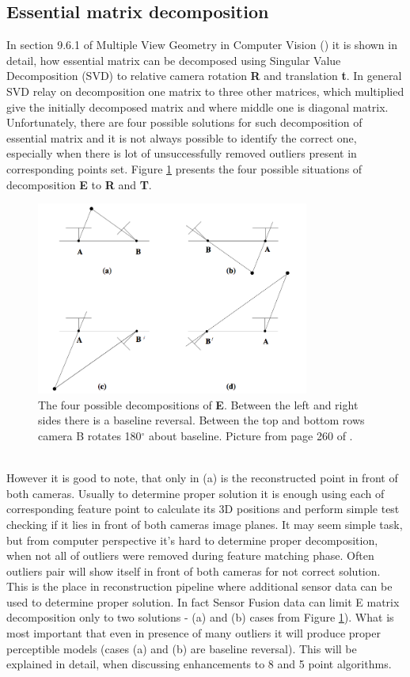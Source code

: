 \subsection{Essential matrix decomposition}
In section 9.6.1 of Multiple View Geometry in Computer Vision (\cite{HartleyMultipleView}) it is shown in detail, how essential matrix can be decomposed using Singular Value Decomposition (SVD) to relative camera rotation \textbf{R} and translation \textbf{t}. In general SVD relay on decomposition one matrix to three other matrices, which multiplied give the initially decomposed matrix and where middle one is diagonal matrix. \\ 
Unfortunately, there are four possible solutions for such decomposition of essential matrix and it is not always possible to identify the correct one, especially when there is lot of unsuccessfully removed outliers present in corresponding points set. Figure \ref{fig:fourAmbig} presents the four possible situations of decomposition \textbf{E} to \textbf{R} and \textbf{T}. 
\begin{figure}[h!]
    \centering
    \includegraphics[width=0.8\textwidth]{fourAmbig}
    \caption[The four possible decompositions of \textbf{E}]{The four possible decompositions of \textbf{E}. Between the left and right sides there is a baseline reversal. Between the top and bottom rows camera B rotates 180$^{\circ}$ about baseline. Picture from page 260 of \cite{HartleyMultipleView}.}
    \label{fig:fourAmbig}
\end{figure}
\\
However it is good to note, that only in (a) is the reconstructed point in front of both cameras. Usually to determine proper solution it is enough using each of corresponding feature point to calculate its 3D positions and perform simple test checking if it lies in front of both cameras image planes. It may seem simple task, but from computer perspective it's hard to determine proper decomposition, when not all of outliers were removed during feature matching phase. Often outliers pair will show itself in front of both cameras for not correct solution.
This is the place in reconstruction pipeline where additional sensor data can be used to determine proper solution. In fact Sensor Fusion data can limit E matrix decomposition only to two solutions - (a) and (b) cases from Figure \ref{fig:fourAmbig}). What is most important that even in presence of many outliers it will produce proper perceptible models (cases (a) and (b) are baseline reversal). This will be explained in detail, when discussing enhancements to 8 and 5 point algorithms.
